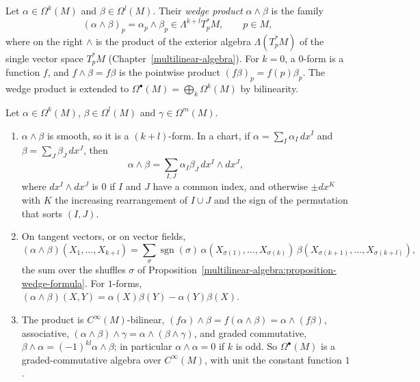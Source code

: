 \begin{definition}\label{differential-forms:definition-wedge}
Let $\alpha \in \Omega^k(M)$ and $\beta \in \Omega^l(M)$. Their \emph{wedge product} $\alpha \wedge \beta$ is the family
\[
(\alpha \wedge \beta)_p = \alpha_p \wedge \beta_p \in \Lambda^{k+l}T_p^*M, \qquad p \in M,
\]
where on the right $\wedge$ is the product of the exterior algebra $\Lambda(T_p^*M)$ of the single vector space $T_p^*M$ (Chapter~\ref{multilinear-algebra}). For $k = 0$, a $0$-form is a function $f$, and
$f \wedge \beta = f\beta$ is the pointwise product $(f\beta)_p = f(p)\beta_p$. The wedge product is extended to $\Omega^\bullet(M) = \bigoplus_k\Omega^k(M)$ by bilinearity.
\end{definition}

\begin{proposition}\label{differential-forms:proposition-wedge}
Let $\alpha \in \Omega^k(M)$, $\beta \in \Omega^l(M)$ and $\gamma \in \Omega^m(M)$.
\begin{enumerate}
\item $\alpha \wedge \beta$ is smooth, so it is a $(k + l)$-form. In a chart, if $\alpha = \sum_I\alpha_I\,dx^I$ and $\beta = \sum_J\beta_J\,dx^J$, then
\[
\alpha \wedge \beta = \sum_{I, J}\alpha_I\beta_J\,dx^I \wedge dx^J,
\]
where $dx^I \wedge dx^J$ is $0$ if $I$ and $J$ have a common index, and otherwise $\pm dx^K$ with $K$ the increasing rearrangement of $I \cup J$ and the sign of the permutation that sorts $(I, J)$.
\item On tangent vectors, or on vector fields,
\[
(\alpha \wedge \beta)(X_1, \ldots, X_{k+l}) = \sum_\sigma\operatorname{sgn}(\sigma)\,\alpha(X_{\sigma(1)}, \ldots, X_{\sigma(k)})\,\beta(X_{\sigma(k+1)}, \ldots, X_{\sigma(k+l)}),
\]
the sum over the shuffles $\sigma$ of Proposition~\ref{multilinear-algebra:proposition-wedge-formula}. For $1$-forms, $(\alpha \wedge \beta)(X, Y) = \alpha(X)\beta(Y) - \alpha(Y)\beta(X)$.
\item The product is $C^\infty(M)$-bilinear, $(f\alpha) \wedge \beta = f(\alpha \wedge \beta) = \alpha \wedge (f\beta)$, associative, $(\alpha \wedge \beta) \wedge \gamma = \alpha \wedge (\beta \wedge \gamma)$, and graded
commutative, $\beta \wedge \alpha = (-1)^{kl}\alpha \wedge \beta$; in particular $\alpha \wedge \alpha = 0$ if $k$ is odd. So $\Omega^\bullet(M)$ is a graded-commutative algebra over $C^\infty(M)$, with unit the constant
function $1$.
\end{enumerate}
\end{proposition}

